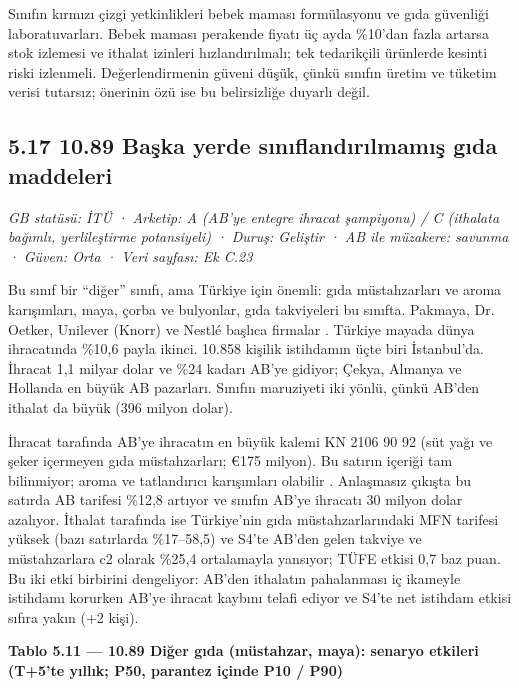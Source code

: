 Sınıfın kırmızı çizgi yetkinlikleri bebek maması formülasyonu ve gıda güvenliği laboratuvarları. Bebek maması perakende fiyatı üç ayda \%10'dan fazla artarsa stok izlemesi ve ithalat izinleri hızlandırılmalı; tek tedarikçili ürünlerde kesinti riski izlenmeli. Değerlendirmenin güveni düşük, çünkü sınıfın üretim ve tüketim verisi tutarsız; önerinin özü ise bu belirsizliğe duyarlı değil.

\hypertarget{nace_kartlar_10-12-517-1089-baux15fka-yerde-sux131nux131flandux131rux131lmamux131ux15f-gux131da-maddeleri}{%
\subsection{5.17 10.89 Başka yerde sınıflandırılmamış gıda maddeleri}\label{nace_kartlar_10-12-517-1089-baux15fka-yerde-sux131nux131flandux131rux131lmamux131ux15f-gux131da-maddeleri}}

\emph{GB statüsü: İTÜ · Arketip: A (AB'ye entegre ihracat şampiyonu) / C (ithalata bağımlı, yerlileştirme potansiyeli) · Duruş: Geliştir · AB ile müzakere: savunma · Güven: Orta · Veri sayfası: Ek C.23}

Bu sınıf bir ``diğer'' sınıfı, ama Türkiye için önemli: gıda müstahzarları ve aroma karışımları, maya, çorba ve bulyonlar, gıda takviyeleri bu sınıfta. Pakmaya, Dr. Oetker, Unilever (Knorr) ve Nestlé başlıca firmalar \etiketH{}. Türkiye mayada dünya ihracatında \%10,6 payla ikinci. 10.858 kişilik istihdamın üçte biri İstanbul'da. İhracat 1,1 milyar dolar ve \%24 kadarı AB'ye gidiyor; Çekya, Almanya ve Hollanda en büyük AB pazarları. Sınıfın maruziyeti iki yönlü, çünkü AB'den ithalat da büyük (396 milyon dolar).

İhracat tarafında AB'ye ihracatın en büyük kalemi KN 2106 90 92 (süt yağı ve şeker içermeyen gıda müstahzarları; €175 milyon). Bu satırın içeriği tam bilinmiyor; aroma ve tatlandırıcı karışımları olabilir \etiketD{}. Anlaşmasız çıkışta bu satırda AB tarifesi \%12,8 artıyor ve sınıfın AB'ye ihracatı 30 milyon dolar azalıyor. İthalat tarafında ise Türkiye'nin gıda müstahzarlarındaki MFN tarifesi yüksek (bazı satırlarda \%17--58,5) ve S4'te AB'den gelen takviye ve müstahzarlara c2 olarak \%25,4 ortalamayla yansıyor; TÜFE etkisi 0,7 baz puan. Bu iki etki birbirini dengeliyor: AB'den ithalatın pahalanması iç ikameyle istihdamı korurken AB'ye ihracat kaybını telafi ediyor ve S4'te net istihdam etkisi sıfıra yakın (+2 kişi).


\textbf{Tablo 5.11 --- 10.89 Diğer gıda (müstahzar, maya): senaryo etkileri (T+5'te yıllık; P50, parantez içinde P10 / P90)}


